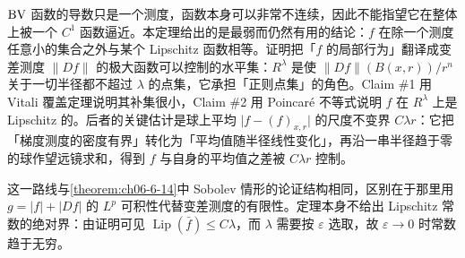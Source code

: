 \documentclass[../../main.tex]{subfiles}%
\begin{document}
\begin{remark}\label{remark:ch06-thm-6-12-动机}
$\mathrm{BV}$ 函数的导数只是一个测度，函数本身可以非常不连续，因此不能指望它在整体上被一个 $C^1$ 函数逼近。本定理给出的是最弱而仍然有用的结论：$f$ 在除一个测度任意小的集合之外与某个 Lipschitz 函数相等。证明把「$f$ 的局部行为」翻译成变差测度 $\lVert Df\rVert$ 的极大函数可以控制的水平集：$R^\lambda$ 是使 $\lVert Df\rVert(B(x,r))/r^n$ 关于一切半径都不超过 $\lambda$ 的点集，它承担「正则点集」的角色。Claim \#1 用 Vitali 覆盖定理说明其补集很小，Claim \#2 用 Poincaré 不等式说明 $f$ 在 $R^\lambda$ 上是 Lipschitz 的。后者的关键估计是球上平均 $\lvert f-(f)_{x,r}\rvert$ 的尺度不变界 $C\lambda r$：它把「梯度测度的密度有界」转化为「平均值随半径线性变化」，再沿一串半径趋于零的球作望远镜求和，得到 $f$ 与自身的平均值之差被 $C\lambda r$ 控制。

这一路线与\cref{theorem:ch06-6-14}中 Sobolev 情形的论证结构相同，区别在于那里用 $g=\lvert f\rvert+\lvert Df\rvert$ 的 $L^p$ 可积性代替变差测度的有限性。定理本身不给出 Lipschitz 常数的绝对界：由证明可见 $\operatorname{Lip}(\bar f)\le C\lambda$，而 $\lambda$ 需要按 $\varepsilon$ 选取，故 $\varepsilon\to0$ 时常数趋于无穷。%
\end{remark}
\end{document}
